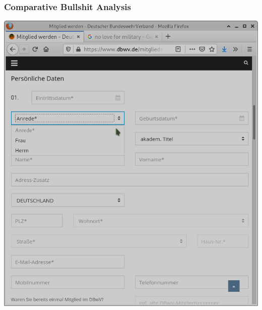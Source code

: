 \documentclass[aspectratio=169,x11names]{beamer}
\begin{document}
\begin{frame}
\frametitle{Comparative Bullshit Analysis}
\begin{minipage}{0.5\textwidth}
\begin{center}
\includegraphics[height=0.7\textheight,keepaspectratio]{images/dbwvb.png} 
\medskip\large


\end{center}
\end{minipage}
\end{frame}
\end{document}

